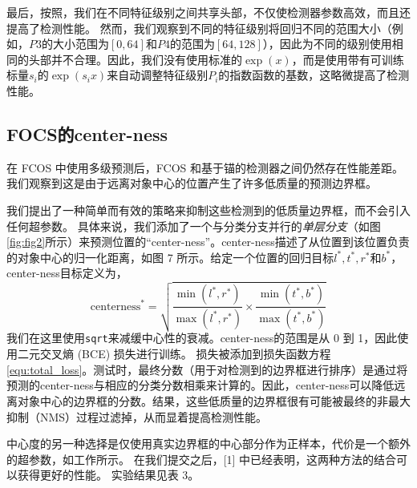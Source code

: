 \documentclass[../main.tex]{subfile}
\begin{document}
最后，按照\cite{fpn, retinanet}，我们在不同特征级别之间共享头部，不仅使检测器参数高效，而且还提高了检测性能。 然而，我们观察到不同的特征级别将回归不同的范围大小（例如，$ P3 $的大小范围为$\left[0,64\right]$和$P4$的范围为$\left[ 64, 128 \right]$），因此为不同的级别使用相同的头部并不合理。因此，我们没有使用标准的$\exp\left(x\right)$，而是使用带有可训练标量$ s_i $的$ \exp\left(s_i x\right) $来自动调整特征级别$ P_i $的指数函数的基数，这略微提高了检测性能。

\subsection{FOCS的center-ness}

在 FCOS 中使用多级预测后，FCOS 和基于锚的检测器之间仍然存在性能差距。 我们观察到这是由于远离对象中心的位置产生了许多低质量的预测边界框。

我们提出了一种简单而有效的策略来抑制这些检测到的低质量边界框，而不会引入任何超参数。 具体来说，我们添加了一个与分类分支并行的\textit{单层分支}（如图\ref{fig:fig2}所示）来预测位置的“center-ness”。center-ness描述了从位置到该位置负责的对象中心的归一化距离，如图 7 所示。给定一个位置的回归目标$ l^\ast, t^\ast, r^\ast$和$ b^\ast$，center-ness目标定义为，
\begin{equation} \label{center-ness}
    \text{centerness}^\ast = \sqrt{\frac{\min\left(l^\ast, r^\ast \right)}{\max\left(l^\ast, r^\ast \right)} \times \frac{\min\left(t^\ast, b^\ast \right)}{\max\left(t^\ast, b^\ast \right)}}
\end{equation}
我们在这里使用\lstinline{sqrt}来减缓中心性的衰减。center-ness的范围是从 0 到 1，因此使用二元交叉熵 (BCE) 损失进行训练。 损失被添加到损失函数方程\ref{equ:total_loss}。测试时，最终分数（用于对检测到的边界框进行排序）是通过将预测的center-ness与相应的分类分数相乘来计算的。因此，center-ness可以降低远离对象中心的边界框的分数。结果，这些低质量的边界框很有可能被最终的非最大抑制（NMS）过程过滤掉，从而显着提高检测性能。

中心度的另一种选择是仅使用真实边界框的中心部分作为正样本，代价是一个额外的超参数，如工作\cite{densebox}所示。 在我们提交之后，[1] 中已经表明，这两种方法的结合可以获得更好的性能。 实验结果见表 3。
\end{document}
